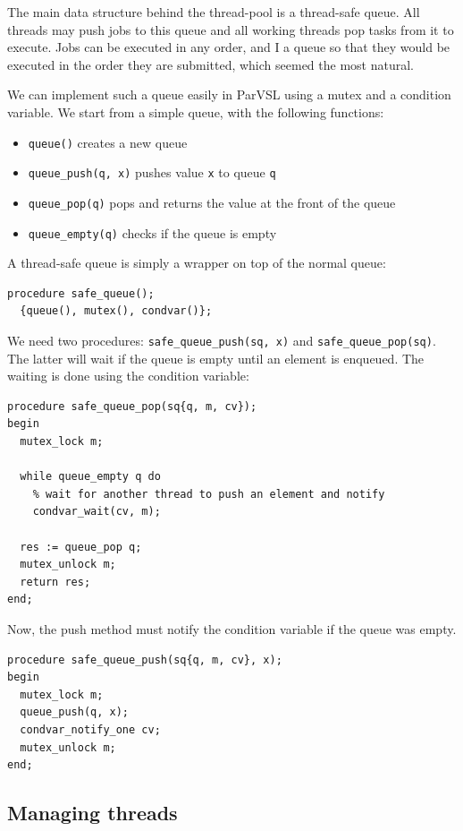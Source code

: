 The main data structure behind the thread-pool is a thread-safe queue. All threads may push
jobs to this queue and all working threads pop tasks from it to execute. Jobs can be executed
in any order, and I a queue so that they would be executed in the order they are submitted, which
seemed the most natural.

We can implement such a queue easily in ParVSL using a mutex and a condition variable. We start
from a simple queue, with the following functions:

\begin{itemize}
\item \texttt{queue()} creates a new queue
\item \texttt{queue\_push(q, x)} pushes value \texttt{x} to queue \texttt{q}
\item \texttt{queue\_pop(q)} pops and returns the value at the front of the queue
\item \texttt{queue\_empty(q)} checks if the queue is empty
\end{itemize}

A thread-safe queue is simply a wrapper on top of the normal queue:
\begin{verbatim}
procedure safe_queue();
  {queue(), mutex(), condvar()};
\end{verbatim}

We need two procedures: \texttt{safe\_queue\_push(sq, x)} and \texttt{safe\_queue\_pop(sq)}. The latter will
wait if the queue is empty until an element is enqueued. The waiting is done using the condition variable:

\begin{verbatim}
procedure safe_queue_pop(sq{q, m, cv});
begin
  mutex_lock m;

  while queue_empty q do
    % wait for another thread to push an element and notify
    condvar_wait(cv, m);

  res := queue_pop q;
  mutex_unlock m;
  return res;
end;
\end{verbatim}

Now, the push method must notify the condition variable if the queue was empty.
\begin{verbatim}
procedure safe_queue_push(sq{q, m, cv}, x);
begin
  mutex_lock m;
  queue_push(q, x);
  condvar_notify_one cv;
  mutex_unlock m;
end;
\end{verbatim}


\subsection{Managing threads}
\label{ssec:managethreads}

